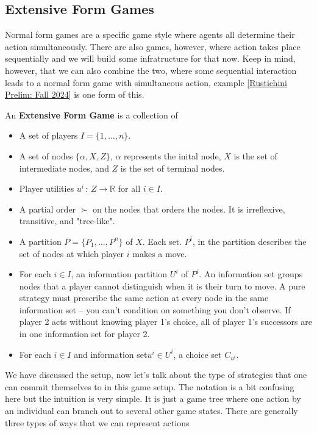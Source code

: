 \documentclass[11pt,english]{article}
\begin{document}
\subsection{Extensive Form Games}
Normal form games are a specific game style where agents all determine their action simultaneously. There are also games, however, where action takes place sequentially and we will build some infratructure for that now. Keep in mind, however, that we can also combine the two, where some sequential interaction leads to a normal form game with simultaneous action, example \ref{Rustichini Prelim: Fall 2024} is one form of this.
\begin{definition}
An \textbf{Extensive Form Game} is a collection of
\begin{itemize}
\item A set of players $I = \{1, \ldots, n\}$.
\item A set of nodes $\{\alpha, X, Z\}$, $\alpha$ represents the inital node, $X$ is the set of intermediate nodes, and $Z$ is the set of terminal nodes.
\item Player utilities $u^i\,:\,Z\to \mathbb{R}$ for all $i\in I$.
\item A partial order $\succ$ on the nodes that orders the nodes. It is irreflexive, transitive, and "tree-like".
\item A partition $P = \{P_1, \ldots, P^n\}$ of $X$. Each set. $P^i$, in the partition describes the set of nodes at which player $i$ makes a move.
\item For each $i\in I$, an information partition $U^i$ of $P^i$. An information set groups nodes that a player cannot distinguish when it is their turn to move. A pure strategy must prescribe the same action at every node in the same information set – you can’t condition on something you don’t observe. If player 2 acts without knowing player 1’s choice, all of player 1’s successors are in one information set for player 2.
\item For each $i\in I$ and information set$u^i\in U^i$, a choice set $C_{u^i}$.
\end{itemize}
\end{definition}
We have discussed the setup, now let's talk about the type of strategies that one can commit themselves to in this game setup. The notation is a bit confusing here but the intuition is very simple. It is just a game tree where one action by an individual can branch out to several other game states. There are generally three types of ways that we can represent actions
\end{document}
